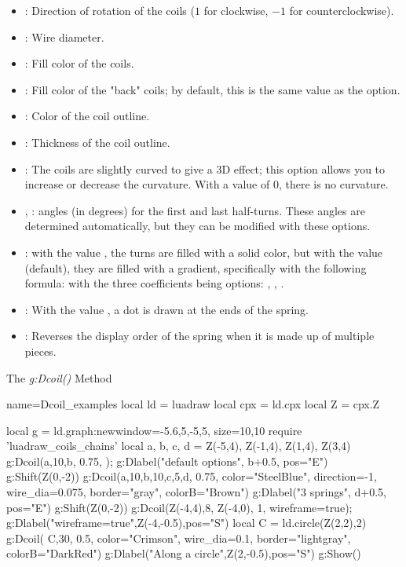 \begin{itemize}
    \begin{itemize}
        \item {}: Direction of rotation of the coils ($1$ for clockwise, $-1$ for counterclockwise).
        \item {}: Wire diameter.
        \item {}: Fill color of the coils.
        \item {}: Fill color of the "back" coils; by default, this is the same value as the  option.
        \item {}: Color of the coil outline.
        \item {}: Thickness of the coil outline.
        \item {}: The coils are slightly curved to give a 3D effect; this option allows you to increase or decrease the curvature. With a value of $0$, there is no curvature.
        \item {}, : angles (in degrees) for the first and last half-turns. These angles are determined automatically, but they can be modified with these options.
        \item {}: with the value \true, the turns are filled with a solid color, but with the value \false (default), they are filled with a gradient, specifically with the following formula:
        with the three coefficients being options: , , .
        \item {}: With the value \true, a dot is drawn at the ends of the spring.
        \item {}: Reverses the display order of the spring when it is made up of multiple pieces.
    \end{itemize}

\begin{demo}{The \emph{g:Dcoil()} Method}
\begin{luadraw}{name=Dcoil_examples}
local ld = luadraw
local cpx = ld.cpx
local Z = cpx.Z

local g = ld.graph:new{window={-5.6,5,-5,5}, size={10,10}}
require 'luadraw_coils_chains'
local a, b, c, d = Z(-5,4), Z(-1,4), Z(1,4), Z(3,4)
g:Dcoil({a,10,b}, 0.75, {}); g:Dlabel("default options", b+0.5, {pos="E"})
g:Shift(Z(0,-2))
g:Dcoil({a,10,b,10,c,5,d}, 0.75, {color="SteelBlue", direction=-1, wire_dia=0.075, 
    border="gray", colorB="Brown"})
g:Dlabel("3 springs", d+0.5, {pos="E"})
g:Shift(Z(0,-2))
g:Dcoil({Z(-4,4),8, Z(-4,0)}, 1, {wireframe=true}); g:Dlabel("wireframe=true",Z(-4,-0.5),{pos="S"})
local C = ld.circle(Z(2,2),2)
g:Dcoil( {C,30}, 0.5, {color="Crimson", wire_dia=0.1, border="lightgray", colorB="DarkRed"})
g:Dlabel("Along a circle",Z(2,-0.5),{pos="S"})
g:Show()
\end{luadraw}
\end{demo}
    

\end{itemize}
